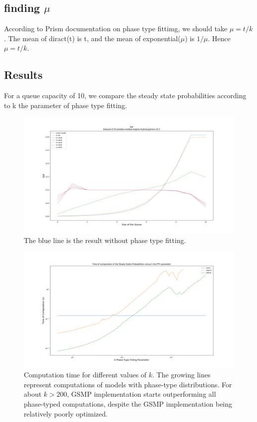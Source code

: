 \documentclass[paper=a4, fontsize=11pt]{scrartcl}
\numberwithin{equation}{section}		%
\numberwithin{figure}{section}			%
\numberwithin{table}{section}				%
\begin{document}
	
	\subsection{finding $\mu$}
	
	According to Prism documentation on phase type fittimg, we should take $\mu = t/k$. The mean of diract(t) is t, and the mean of exponential($\mu$) is $1/\mu$. Hence $\mu = t/k$.
	
	
	
	\subsection{Results}
	
	For a queue capacity of 10, we compare the steady state probabilities according to k the parameter of phase type fitting.
	
	\begin{figure}
		\centering
		\includegraphics[width=18cm]{picture/ssp_hybrid.png}
		\caption{The blue line is the result without phase type fitting.}
		\label{fig:ssp_hybrid}
	\end{figure}
	
	\begin{figure}
		\centering
		\includegraphics[width=16cm]{picture/time_of_computation.png}
		\caption{Computation time for different values of $k$. The growing lines represent computations of models with phase-type distributions. For about $k>200$, GSMP implementation starts outperforming all phase-typed computations, despite the GSMP implementation being relatively poorly optimized.}
		\label{fig:time1}
	\end{figure}	
	
\end{document}
